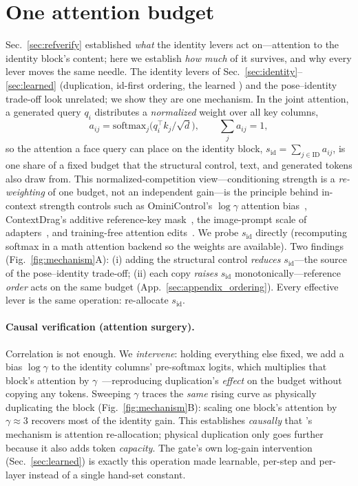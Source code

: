 \section{One attention budget}
\label{sec:mechanism}
Sec.~\ref{sec:refverify} established \emph{what} the identity levers act
on---attention to the identity block's content; here we establish \emph{how
much} of it survives, and why every lever moves the same needle. The identity
levers of Sec.~\ref{sec:identity}--\ref{sec:learned} (duplication, id-first
ordering, the learned \gate{}) and the pose--identity
trade-off look unrelated; we show they are one mechanism. In the
joint attention, a generated query $q_i$ distributes a \emph{normalized} weight
over all key columns,
\begin{equation}
a_{ij}=\mathrm{softmax}_j\!\big(q_i^\top k_j/\sqrt{d}\big),\qquad \textstyle\sum_j a_{ij}=1 ,
\label{eq:attn}
\end{equation}
so the attention a face query can place on the identity block,
$s_{\mathrm{id}}=\sum_{j\in\mathrm{ID}} a_{ij}$, is one share of a fixed budget
that the structural control, text, and generated tokens also draw from. This
normalized-competition view---conditioning strength is a \emph{re-weighting} of
one budget, not an independent gain---is the principle behind in-context strength
controls such as OminiControl's $\log\gamma$ attention bias~\cite{ominicontrol},
ContextDrag's additive reference-key mask~\cite{contextdrag}, the image-prompt
scale of adapters~\cite{ipadapter}, and training-free attention
edits~\cite{masactrl,p2p}. We probe
$s_{\mathrm{id}}$ directly (recomputing softmax in a math attention backend so
the weights are available). Two findings (Fig.~\ref{fig:mechanism}A):
(i) adding the structural control \emph{reduces} $s_{\mathrm{id}}$---the source
of the pose--identity trade-off; (ii) each \dupid{} copy \emph{raises}
$s_{\mathrm{id}}$ monotonically---reference \emph{order} acts on the same
budget (App.~\ref{sec:appendix_ordering}).
Every effective lever is the same operation: re-allocate $s_{\mathrm{id}}$.

\paragraph{Causal verification (attention surgery).} Correlation is not enough.
We \emph{intervene}: holding everything else fixed, we add a bias $\log\gamma$ to
the identity columns' pre-softmax logits, which multiplies that block's
attention by $\gamma$~\cite{ominicontrol,contextdrag}---reproducing duplication's
\emph{effect} on the budget without copying any tokens. Sweeping $\gamma$ traces the \emph{same} rising
\csim{} curve as physically duplicating the block (Fig.~\ref{fig:mechanism}B):
scaling one block's attention by $\gamma{\approx}3$ recovers most of the
\dupid{} identity gain. This establishes \emph{causally} that \dupid's mechanism
is attention re-allocation; physical duplication only goes further because it
also adds token \emph{capacity}. The gate's own log-gain intervention
(Sec.~\ref{sec:learned}) is exactly this operation made learnable, per-step and
per-layer instead of a single hand-set constant.

